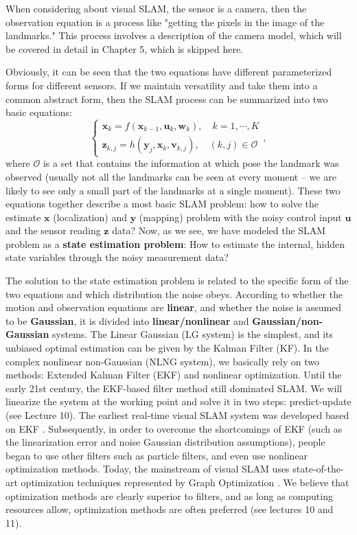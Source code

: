 When considering about visual SLAM, the sensor is a camera, then the observation equation is a process like "getting the pixels in the image of the landmarks." This process involves a description of the camera model, which will be covered in detail in Chapter 5, which is skipped here.

Obviously, it can be seen that the two equations have different parameterized forms for different sensors. If we maintain versatility and take them into a common abstract form, then the SLAM process can be summarized into two basic equations:
\begin{equation}
\label{eq:slamproblem}
\left\{ \begin{array}{l}
{\mathbf{x}_k} = f\left( {{\mathbf{x}_{k - 1}},{\mathbf{u}_k}}, \mathbf{w}_k \right),\quad k=1,\cdots, K\\
{\mathbf{z}_{k,j}} = h\left( {{ \mathbf{y}_j},{ \mathbf{x}_k}}, \mathbf{v}_{k,j} \right), \quad (k,j) \in \mathcal{O}
\end{array} \right. ,
\end{equation}
where $\mathcal{O}$ is a set that contains the information at which pose the landmark was observed (usually not all the landmarks can be seen at every moment – ​​we are likely to see only a small part of the landmarks  at a single moment). These two equations together describe a most basic SLAM problem: how to solve the estimate $\mathbf{x}$ (localization) and $\mathbf{y}$ (mapping) problem with the noisy control input $\mathbf{u}$ and the sensor reading $\mathbf{z}$ data? Now, as we see, we have modeled the SLAM problem as a \textbf{state estimation problem}: How to estimate the internal, hidden state variables through the noisy measurement data?

The solution to the state estimation problem is related to the specific form of the two equations and which distribution the noise obeys. According to whether the motion and observation equations are \textbf{linear}, and whether the noise is assumed to be \textbf{Gaussian}, it is divided into \textbf{linear/nonlinear} and \textbf{Gaussian/non-Gaussian} systems. The Linear Gaussian (LG system) is the simplest, and its unbiased optimal estimation can be given by the Kalman Filter (KF). In the complex nonlinear non-Gaussian (NLNG system), we basically rely on two methods: Extended Kalman Filter (EKF) and nonlinear optimization. Until the early 21st century, the EKF-based filter method still dominated SLAM. We will linearize the system at the working point and solve it in two steps: predict-update (see Lecture 10). The earliest real-time visual SLAM system was developed based on EKF {\cite{Davison2007}}. Subsequently, in order to overcome the shortcomings of EKF (such as the linearization error and noise Gaussian distribution assumptions), people began to use other filters such as particle filters, and even use nonlinear optimization methods. Today, the mainstream of visual SLAM uses state-of-the-art optimization techniques represented by Graph Optimization {\cite{Strasdat2012}}. We believe that optimization methods are clearly superior to filters, and as long as computing resources allow, optimization methods are often preferred (see lectures 10 and 11).


